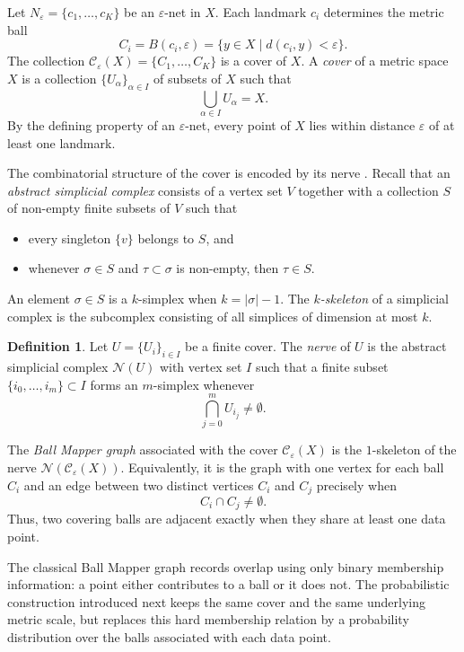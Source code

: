 \documentclass[9pt,a4paper,twocolumn,twoside]{extarticle}
\theoremstyle{definition}
\newtheorem{definition}[theorem]{Definition}
\begin{document}
Let $N_\varepsilon=\{c_1,\dots,c_K\}$ be an $\varepsilon$-net in $X$. Each landmark $c_i$ determines the metric ball
\[
C_i = B(c_i,\varepsilon) = \{y\in X \mid d(c_i,y)<\varepsilon\}.
\]
The collection $\mathcal C_\varepsilon(X)=\{C_1,\dots,C_K\}$ is a cover of $X$. A \emph{cover} of a metric space $X$ is a collection $\{U_\alpha\}_{\alpha \in I}$ of subsets of $X$ such that
\[
\bigcup_{\alpha \in I}U_\alpha = X.
\]
By the defining property of an $\varepsilon$-net, every point of $X$ lies within distance $\varepsilon$ of at least one landmark.

The combinatorial structure of the cover is encoded by its nerve \cite{hatcher2002algebraic}. Recall that an \emph{abstract simplicial complex} consists of a vertex set $V$ together with a collection $S$ of non-empty finite subsets of $V$ such that
  \begin{itemize}
  \item every singleton $\{v\}$ belongs to $S$, and
  \item whenever $\sigma \in S$ and $\tau \subset \sigma$ is non-empty, then $\tau \in S$.
  \end{itemize}
An element $\sigma \in S$ is a $k$-simplex when $k = |\sigma|-1$. The \emph{$k$-skeleton} of a simplicial complex is the subcomplex consisting of all simplices of dimension at most $k$.

\begin{definition}
Let $U=\{U_i\}_{i\in I}$ be a finite cover. The \emph{nerve} of $U$ is the abstract simplicial complex $\mathcal N(U)$ with vertex set $I$ such that a finite subset $\{i_0,\dots,i_m\} \subset I$ forms an $m$-simplex whenever
\[
\bigcap_{j=0}^m U_{i_j} \neq \emptyset.
\]
\end{definition}

The \emph{Ball Mapper graph} associated with the cover $\mathcal C_\varepsilon(X)$ is the $1$-skeleton of the nerve $\mathcal N(\mathcal C_\varepsilon(X))$. Equivalently, it is the graph with one vertex for each ball $C_i$ and an edge between two distinct vertices $C_i$ and $C_j$ precisely when
\[
C_i\cap C_j\neq \emptyset.
\]
Thus, two covering balls are adjacent exactly when they share at least one data point.

The classical Ball Mapper graph records overlap using only binary membership information: a point either contributes to a ball or it does not. The probabilistic construction introduced next keeps the same cover and the same underlying metric scale, but replaces this hard membership relation by a probability distribution over the balls associated with each data point.
\end{document}
